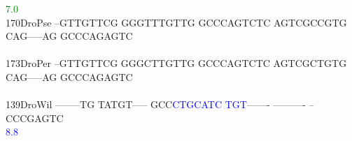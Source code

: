 \documentclass[11pt,twoside,reqno,a4paper]{article}
\begin{document}
{\hspace*{4\charwidth}\hspace*{7\charwidth}\hspace*{1\charwidth}\hspace*{1\charwidth}\hspace*{1\charwidth}\hspace*{1\charwidth}\hspace*{1\charwidth}\hspace*{53\charwidth}\textcolor{green}{7.0}\hspace*{1\charwidth}\\
170\hspace*{1\charwidth}DroPse	--GTTGTTCG	GGGTTTGTTG	GCCCAGTCTC	AGTCGCCGTG	CAG-----AG	GCCCAGAGTC	\\
\hspace*{4\charwidth}\hspace*{7\charwidth}\hspace*{1\charwidth}\hspace*{1\charwidth}\hspace*{1\charwidth}\hspace*{1\charwidth}\hspace*{1\charwidth}\hspace*{1\charwidth}\\
173\hspace*{1\charwidth}DroPer	--GTTGTTCG	GGGCTTGTTG	GCCCAGTCTC	AGTCGCTGTG	CAG-----AG	GCCCAGAGTC	\\
\hspace*{4\charwidth}\hspace*{7\charwidth}\hspace*{1\charwidth}\hspace*{1\charwidth}\hspace*{1\charwidth}\hspace*{1\charwidth}\hspace*{1\charwidth}\hspace*{1\charwidth}\\
139\hspace*{1\charwidth}DroWil	--------TG	TATGT-----	GCC\textcolor{blue}{C}\textcolor{blue}{T}\textcolor{blue}{G}\textcolor{blue}{C}\textcolor{blue}{A}\textcolor{blue}{T}\textcolor{blue}{C}	\textcolor{blue}{T}\textcolor{blue}{G}\textcolor{blue}{T}-------	----------	--CCCGAGTC	\\
\hspace*{4\charwidth}\hspace*{7\charwidth}\hspace*{1\charwidth}\hspace*{1\charwidth}\hspace*{23\charwidth}\textcolor{blue}{8.8}\hspace*{1\charwidth}\hspace*{1\charwidth}\hspace*{1\charwidth}\hspace*{1\charwidth}\\
}
\end{document}
